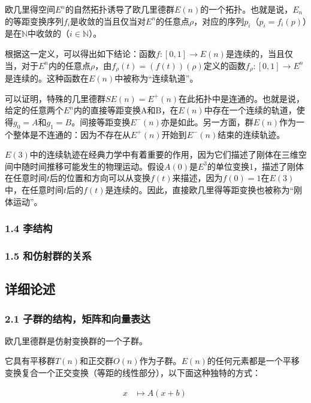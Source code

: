 欧几里得空间$E^n$的自然拓扑诱导了欧几里德群$E(n)$的一个拓扑。也就是说，$E_n$的等距变换序列$f_i$是收敛的当且仅当对$E^n$的任意点$\rho$，对应的序列$p_i$（$p_i = f_i(p)$）是在$\mathbb{N}$中收敛的（$i \in \mathbb{N}$）。

根据这一定义，可以得出如下结论：函数$f: [0,1] \rightarrow E(n)$是连续的，当且仅当，对于$E^n$内的任意点$\rho$，由$f_{\rho}(t) = (f(t))(\rho)$定义的函数$f_{\rho}: [0,1] \rightarrow E^n$是连续的。这种函数在$E(n)$中被称为“连续轨道”。

可以证明，特殊的几里德群$SE(n) = E^+(n)$在此拓扑中是连通的。也就是说，给定的任意两个$E^n$内的直接等距变换A和B，在$E(n)$中存在一个连续的轨道，使得$g_0 = A$和$g_1 = B$。间接等距变换$E^-(n)$亦是如此。另一方面，群$E(n)$作为一个整体是不连通的：因为不存在从$E^+(n)$开始到$E^-(n)$结束的连续轨迹。

$E(3)$中的连续轨迹在经典力学中有着重要的作用，因为它们描述了刚体在三维空间中随时间推移可能发生的物理运动。假设$A(0)$是$E^3$的单位变换1，描述了刚体在任意时间$t$后的位置和方向可以从变换$f(t)$来描述，因为$f(0) = 1$在$E(3)$中，在任意时间$t$后的$f(t)$是连续的。因此，直接欧几里得等距变换也被称为“刚体运动”。


\subsubsection{1.4 李结构}



\subsubsection{1.5 和仿射群的关系}



\subsection{详细论述}



\subsubsection{2.1 子群的结构，矩阵和向量表达}

欧几里德群是仿射变换群的一个子群。

它具有平移群$T(n)$和正交群$O(n)$作为子群。$E(n)$的任何元素都是一个平移变换复合一个正交变换（等距的线性部分），以下面这种独特的方式：

\begin{align}
x & \mapsto A(x + b)~
\end{align}

